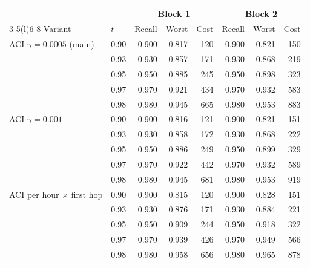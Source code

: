 \begin{tabular}{@{}llrrrrrr@{}}
\toprule
 & & \multicolumn{3}{c}{Block 1} & \multicolumn{3}{c}{Block 2} \\
\cmidrule(lr){3-5}\cmidrule(l){6-8}
Variant & $t$ & Recall & Worst & Cost & Recall & Worst & Cost \\
\midrule
ACI $\gamma=0.0005$ (main) & 0.90 & 0.900 & 0.817 & 120 & 0.900 & 0.821 & 150 \\
 & 0.93 & 0.930 & 0.857 & 171 & 0.930 & 0.868 & 219 \\
 & 0.95 & 0.950 & 0.885 & 245 & 0.950 & 0.898 & 323 \\
 & 0.97 & 0.970 & 0.921 & 434 & 0.970 & 0.932 & 583 \\
 & 0.98 & 0.980 & 0.945 & 665 & 0.980 & 0.953 & 883 \\
\addlinespace[2pt]
ACI $\gamma=0.001$ & 0.90 & 0.900 & 0.816 & 121 & 0.900 & 0.821 & 151 \\
 & 0.93 & 0.930 & 0.858 & 172 & 0.930 & 0.868 & 222 \\
 & 0.95 & 0.950 & 0.886 & 249 & 0.950 & 0.899 & 329 \\
 & 0.97 & 0.970 & 0.922 & 442 & 0.970 & 0.932 & 589 \\
 & 0.98 & 0.980 & 0.945 & 681 & 0.980 & 0.953 & 919 \\
\addlinespace[2pt]
ACI per hour $\times$ first hop & 0.90 & 0.900 & 0.815 & 120 & 0.900 & 0.828 & 151 \\
 & 0.93 & 0.930 & 0.876 & 171 & 0.930 & 0.884 & 221 \\
 & 0.95 & 0.950 & 0.909 & 244 & 0.950 & 0.918 & 322 \\
 & 0.97 & 0.970 & 0.939 & 426 & 0.970 & 0.949 & 566 \\
 & 0.98 & 0.980 & 0.958 & 656 & 0.980 & 0.965 & 878 \\
\bottomrule
\end{tabular}
